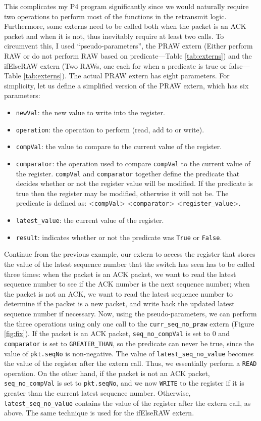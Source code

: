 This complicates my P4 program significantly since we would naturally require two operations to perform most of the functions in the retransmit logic. Furthermore, some externs need to be called both when the packet is an ACK packet and when it is not, thus inevitably require at least two calls. To circumvent this, I used ``pseudo-parameters'', the PRAW extern (Either perform RAW or do not perform RAW based on predicate---Table \ref{tab:externs}) and the ifElseRAW extern (Two RAWs, one each for when a predicate is true or false---Table \ref{tab:externs}). The actual PRAW extern has eight parameters. For simplicity, let us define a simplified version of the PRAW extern, which has six parameters:
\begin{itemize}[leftmargin=*, noitemsep]
	\item \verb|newVal|: the new value to write into the register.
	\item \verb|operation|: the operation to perform (read, add to or write).
	\item \verb|compVal|: the value to compare to the current value of the register.
	\item \verb|comparator|: the operation used to compare \verb|compVal| to the current value of the register. \verb|compVal| and \verb|comparator| together define the predicate that decides whether or not the register value will be modified. If the predicate is true then the register may be modified, otherwise it will not be. The predicate is defined as: <\verb|compVal|> <\verb|comparator|> <\verb|register_value|>.
	\item \verb|latest_value|: the current value of the register.
	\item \verb|result|: indicates whether or not the predicate was \verb|True| or \verb|False|.
\end{itemize}

Continue from the previous example, our extern to access the register that stores the value of the latest sequence number that the switch has seen has to be called three times: when the packet is an ACK packet, we want to read the latest sequence number to see if the ACK number is the next sequence number; when the packet is not an ACK, we want to read the latest sequence number to determine if the packet is a new packet, and write back the updated latest sequence number if necessary. Now, using the pseudo-parameters, we can perform the three operations using only one call to the \verb|curr_seq_no_praw| extern (Figure \ref{fig:fix}). If the packet is an ACK packet, \verb|seq_no_compVal| is set to 0 and \verb|comparator| is set to \verb|GREATER_THAN|, so the predicate can never be true, since the value of \verb|pkt.seqNo| is non-negative. The value of \verb|latest_seq_no_value| becomes the value of the register after the extern call. Thus, we essentially perform a \verb|READ| operation. On the other hand, if the packet is not an ACK packet, \verb|seq_no_compVal| is set to \verb|pkt.seqNo|, and we now \verb|WRITE| to the register if it is greater than the current latest sequence number. Otherwise, \verb|latest_seq_no_value| contains the value of the register after the extern call, as above. The same technique is used for the ifElseRAW extern.

